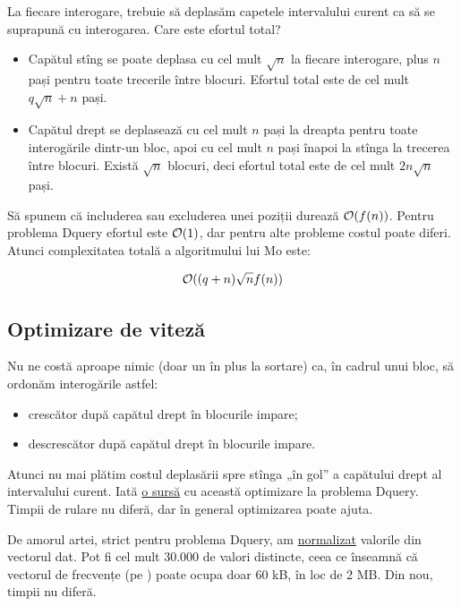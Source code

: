\documentclass[../main.tex]{subfiles}
\begin{document}
La fiecare interogare, trebuie să deplasăm capetele intervalului curent ca să se suprapună cu interogarea. Care este efortul total?

\begin{itemize}
  \item Capătul stîng se poate deplasa cu cel mult $\sqrt{n}$ la fiecare interogare, plus $n$ pași pentru toate trecerile între blocuri. Efortul total este de cel mult $q \sqrt{n} + n$ pași.
  \item Capătul drept se deplasează cu cel mult $n$ pași la dreapta pentru toate interogările dintr-un bloc, apoi cu cel mult $n$ pași înapoi la stînga la trecerea între blocuri. Există $\sqrt{n}$ blocuri, deci efortul total este de cel mult $2n \sqrt n$ pași.
\end{itemize}

Să spunem că includerea sau excluderea unei poziții durează $\mathcal{O}(f(n))$. Pentru problema Dquery efortul este $\mathcal{O}(1)$, dar pentru alte probleme costul poate diferi. Atunci complexitatea totală a algoritmului lui Mo este:

$$\mathcal{O}((q + n) \sqrt{n} f(n))$$

\subsection{Optimizare de viteză}

Nu ne costă aproape nimic (doar un  în plus la sortare) ca, în cadrul unui bloc, să ordonăm interogările astfel:

\begin{itemize}
  \item crescător după capătul drept în blocurile impare;
  \item descrescător după capătul drept în blocurile impare.
\end{itemize}

Atunci nu mai plătim costul deplasării spre stînga „în gol” a capătului drept al intervalului curent. Iată \href{https://github.com/CatalinFrancu/nerdvana/blob/main/problems/spoj/dquery/cata-mo-v2.cpp#L42}{o sursă} cu această optimizare la problema Dquery. Timpii de rulare nu diferă, dar în general optimizarea poate ajuta.

De amorul artei, strict pentru problema Dquery, am \href{https://github.com/CatalinFrancu/nerdvana/blob/main/problems/spoj/dquery/cata-mo-v3.cpp}{normalizat} valorile din vectorul dat. Pot fi cel mult 30.000 de valori distincte, ceea ce înseamnă că vectorul de frecvențe (pe ) poate ocupa doar 60 kB, în loc de 2 MB. Din nou, timpii nu diferă.
\end{document}
